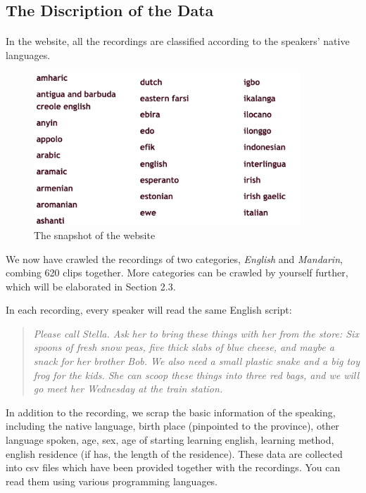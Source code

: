 \subsection{The Discription of the Data}
\paragraph{}
In the website, all the recordings are classified according to the speakers' native languages.

\begin{figure}[ht]
\begin{center}
\includegraphics[width=10cm]{classification.png}
\end{center}
\caption{The snapshot of the website}
\end{figure}

We now have crawled the recordings of two categories, \emph{English} and \emph{Mandarin}, combing 620 clips together. More categories can be crawled by yourself further, which will be elaborated in Section 2.3.

In each recording, every speaker will read the same English script:
\begin{quote}\emph{
Please call Stella. Ask her to bring these things with her from the store: Six spoons of fresh snow peas, five thick slabs of blue cheese, and maybe a snack for her brother Bob. We also need a small plastic snake and a big toy frog for the kids. She can scoop these things into three red bags, and we will go meet her Wednesday at the train station.}
\end{quote}

In addition to the recording, we scrap the basic information of the speaking, including the native language, birth place (pinpointed to the province), other language spoken, age, sex, age of starting learning english, learning method, english residence (if has, the length of the residence). These data are collected into csv files which have been provided together with the recordings. You can read them using various programming languages.

